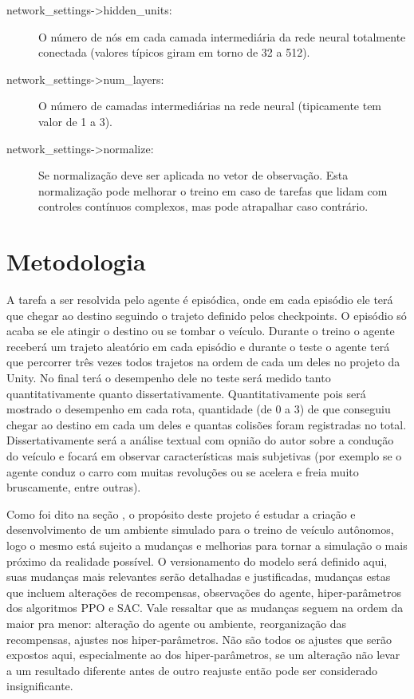 \begin{description}
   \item [network\_settings->hidden\_units:] O número de nós em cada camada intermediária da rede neural totalmente conectada (valores típicos giram em torno de 32 a 512).
   \item [network\_settings->num\_layers:] O número de camadas intermediárias na rede neural (tipicamente tem valor de 1 a 3).
   \item [network\_settings->normalize:] Se normalização deve ser aplicada no vetor de observação. Esta normalização pode melhorar o treino em caso de tarefas que lidam com controles contínuos complexos, mas pode atrapalhar caso contrário.
\end{description}

\section{Metodologia}
A tarefa a ser resolvida pelo agente é episódica, onde em cada episódio ele terá que chegar ao destino seguindo o trajeto definido pelos checkpoints. O episódio só acaba se ele atingir o destino ou se tombar o veículo. Durante o treino o agente receberá um trajeto aleatório em cada episódio e durante o teste o agente terá que percorrer três vezes todos trajetos na ordem de cada um deles no projeto da Unity. No final terá o desempenho dele no teste será medido tanto quantitativamente quanto dissertativamente. Quantitativamente pois será mostrado o desempenho em cada rota, quantidade (de 0 a 3) de que conseguiu chegar ao destino em cada um deles e quantas colisões foram registradas no total. Dissertativamente será a análise textual com opnião do autor sobre a condução do veículo e focará em observar características mais subjetivas (por exemplo se o agente conduz o carro com muitas revoluções ou se acelera e freia muito bruscamente, entre outras). 

Como foi dito na seção , o propósito deste projeto é estudar a criação e desenvolvimento de um ambiente simulado para o treino de veículo autônomos, logo o mesmo está sujeito a mudanças e melhorias para tornar a simulação o mais próximo da realidade possível. O versionamento do modelo será definido aqui, suas mudanças mais relevantes serão detalhadas e justificadas, mudanças estas que incluem alterações de recompensas, observações do agente, hiper-parâmetros dos algoritmos PPO e SAC. Vale ressaltar que as mudanças seguem na ordem da maior pra menor: alteração do agente ou ambiente, reorganização das recompensas, ajustes nos hiper-parâmetros. Não são todos os ajustes que serão expostos aqui, especialmente ao dos hiper-parâmetros, se um alteração não levar a um resultado diferente antes de outro reajuste então pode ser considerado insignificante.

